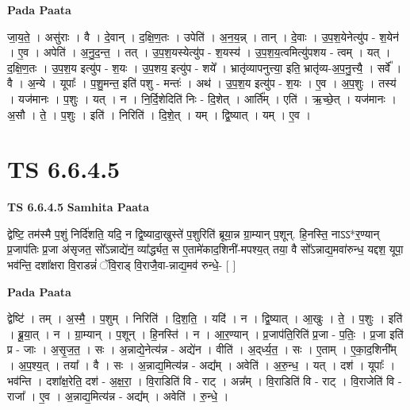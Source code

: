 \documentclass[17pt]{extarticle}
\begin{document}
\textbf{Pada Paata} \newline

जा॒य॒ते॒ । असु॑राः । वै । दे॒वान् । द॒क्षि॒ण॒तः । उपेति॑ । अ॒न॒य॒न्न् । तान् । दे॒वाः । उ॒प॒श॒येनेत्यु॑प - श॒येन॑ । ए॒व । अपेति॑ । अ॒नु॒द॒न्त॒ । तत् । उ॒प॒श॒यस्येत्यु॑प - श॒यस्य॑ । उ॒प॒श॒य॒त्वमित्यु॑पशय - त्वम् । यत् । द॒क्षि॒ण॒तः । उ॒प॒श॒य इत्यु॑प - श॒यः । उ॒प॒शय॒ इत्यु॑प - शये᳚ । भ्रातृ॑व्यापनुत्त्या॒ इति॒ भ्रातृ॑व्य-अ॒प॒नु॒त्त्यै॒ । सर्वे᳚ । वै । अ॒न्ये । यूपाः᳚ । प॒शु॒मन्त॒ इति॑ पशु - मन्तः॑ । अथ॑ । उ॒प॒श॒य इत्यु॑प - श॒यः । ए॒व । अ॒प॒शुः । तस्य॑ । यज॑मानः । प॒शुः । यत् । न । नि॒र्दि॒शेदिति॑ निः - दि॒शेत् । आर्ति᳚म् । एति॑ । ऋ॒च्छे॒त् । यज॑मानः । अ॒सौ । ते॒ । प॒शुः । इति॑ । निरिति॑ । दि॒शे॒त् । यम् । द्वि॒ष्यात् । यम् । ए॒व ।  \newline




\section*{ TS 6.6.4.5 }

\textbf{TS 6.6.4.5 } \newline
\textbf{Samhita Paata} \newline

द्वेष्टि॒ तम॑स्मै प॒शुं निर्दि॑शति॒ यदि॒ न द्वि॒ष्यादा॒खुस्ते॑ प॒शुरिति॑ ब्रूया॒न्न ग्रा॒म्यान् प॒शून्. हि॒नस्ति॒ नाऽऽ*र॒ण्यान् प्र॒जाप॑तिः प्र॒जा अ॑सृजत॒ सो᳚ऽन्नाद्ये॑न॒ व्या᳚र्द्ध्यत॒ स ए॒तामे॑काद॒शिनी॑-मपश्य॒त् तया॒ वै सो᳚ऽन्नाद्य॒मवा॑रुन्ध॒ यद्दश॒ यूपा॒ भव॑न्ति॒ दशा᳚क्षरा वि॒राडन्नं॑ ॅवि॒राड् वि॒राजै॒वा-न्नाद्य॒मव॑ रुन्धे॒- [  ] \newline

\textbf{Pada Paata} \newline

द्वेष्टि॑ । तम् । अ॒स्मै॒ । प॒शुम् । निरिति॑ । दि॒श॒ति॒ । यदि॑ । न । द्वि॒ष्यात् । आ॒खुः । ते॒ । प॒शुः । इति॑ । ब्रू॒या॒त् । न । ग्रा॒म्यान् । प॒शून् । हि॒नस्ति॑ । न । आ॒र॒ण्यान् । प्र॒जाप॑ति॒रिति॑ प्र॒जा - प॒तिः॒ । प्र॒जा इति॑ प्र - जाः । अ॒सृ॒ज॒त॒ । सः । अ॒न्नाद्ये॒नेत्य॑न्न - अद्ये॑न । वीति॑ । अ॒द्‌र्ध्य॒त॒ । सः । ए॒ताम् । ए॒का॒द॒शिनी᳚म् । अ॒प॒श्य॒त् । तया᳚ । वै । सः । अ॒न्नाद्य॒मित्य॑न्न - अद्य᳚म् । अवेति॑ । अ॒रु॒न्ध॒ । यत् । दश॑ । यूपाः᳚ । भव॑न्ति । दशा᳚क्ष॒रेति॒ दश॑ - अ॒क्ष॒रा॒ । वि॒राडिति॑ वि - राट् । अन्न᳚म् । वि॒राडिति॑ वि - राट् । वि॒राजेति॑ वि - राजा᳚ । ए॒व । अ॒न्नाद्य॒मित्य॑न्न - अद्य᳚म् । अवेति॑ । रु॒न्धे॒ ।  \newline
\end{document}
